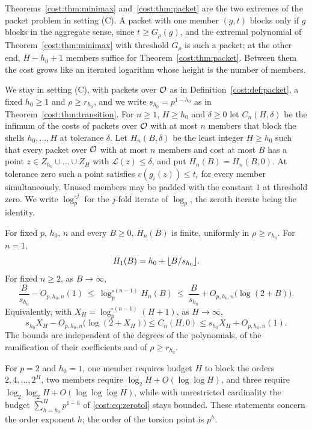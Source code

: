 Theorems~\ref{cost:thm:minimax} and~\ref{cost:thm:packet} are the two extremes of the packet
problem in setting (C). A packet with one member $(g,t)$ blocks only if $g$ blocks in the
aggregate sense, since $t\ge G_\rho(g)$, and the extremal polynomial of
Theorem~\ref{cost:thm:minimax} with threshold $G_\rho$ is such a packet; at the other end,
$H-h_0+1$ members suffice for Theorem~\ref{cost:thm:packet}. Between them the cost grows
like an iterated logarithm whose height is the number of members.

We stay in setting (C), with packets over $\mathcal{O}$ as in Definition~\ref{cost:def:packet}, a
fixed $h_0\ge1$ and $\rho\ge r_{h_0}$, and we write $s_{h_0}=p^{1-h_0}$ as in
Theorem~\ref{cost:thm:transition}. For $n\ge1$, $H\ge h_0$ and $\delta\ge0$ let
$C_n(H,\delta)$ be the infimum of the costs of packets over $\mathcal{O}$ with at most $n$ members
that block the shells $h_0,\dots,H$ at tolerance $\delta$. Let $H_n(B,\delta)$ be the least
integer $H\ge h_0$ such that every packet over $\mathcal{O}$ with at most $n$ members and cost at
most $B$ has a point $z\in Z_{h_0}\cup\dots\cup Z_H$ with $\mathcal L(z)\le\delta$, and put
$H_n(B)=H_n(B,0)$. At tolerance zero such a point satisfies $v(g_i(z))\le t_i$ for every
member simultaneously. Unused members may be padded with the constant $1$ at threshold zero.
We write $\log_p^{\circ j}$ for the $j$-fold iterate of $\log_p$, the zeroth iterate being the
identity.

\begin{theorem}\label{cost:thm:cardinality}
For fixed $p$, $h_0$, $n$ and every $B\ge0$, $H_n(B)$ is finite, uniformly in
$\rho\ge r_{h_0}$. For $n=1$,
\[
 H_1(B)=h_0+\lfloor B/s_{h_0}\rfloor .
\]
For fixed $n\ge2$, as $B\to\infty$,
\begin{equation}\label{cost:eq:tower}
 \frac B{s_{h_0}}-O_{p,h_0,n}(1)\ \le\ \log_p^{\circ(n-1)}H_n(B)\ \le\
 \frac B{s_{h_0}}+O_{p,h_0,n}\bigl(\log(2+B)\bigr).
\end{equation}
Equivalently, with $X_H=\log_p^{\circ(n-1)}(H+1)$, as $H\to\infty$,
\begin{equation}\label{cost:eq:towerinverse}
 s_{h_0}X_H-O_{p,h_0,n}\bigl(\log(2+X_H)\bigr)\le C_n(H,0)\le s_{h_0}X_H+O_{p,h_0,n}(1).
\end{equation}
The bounds are independent of the degrees of the polynomials, of the ramification of their
coefficients and of $\rho\ge r_{h_0}$.
\end{theorem}

For $p=2$ and $h_0=1$, one member requires budget $H$ to block the orders
$2,4,\dots,2^H$, two members require $\log_2H+O(\log\log H)$, and three require
$\log_2\log_2H+O(\log\log\log H)$, while with unrestricted cardinality the budget
$\sum_{h=h_0}^Hp^{1-h}$ of \eqref{cost:eq:zerotol} stays bounded. These statements concern
the order exponent $h$; the order of the torsion point is $p^h$.

